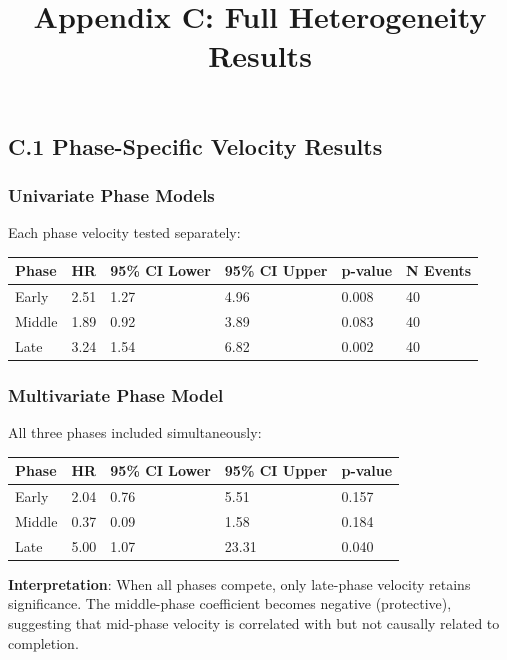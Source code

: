 \documentclass[
  12pt,
  letterpaper,
]{article}
\title{Appendix C: Full Heterogeneity Results}
\author{}
\date{}
\begin{document}
\maketitle


\subsection{C.1 Phase-Specific Velocity
Results}\label{c.1-phase-specific-velocity-results}

\subsubsection{Univariate Phase Models}\label{univariate-phase-models}

Each phase velocity tested separately:

\begin{longtable}[]{@{}llllll@{}}
\toprule\noalign{}
Phase & HR & 95\% CI Lower & 95\% CI Upper & p-value & N Events \\
\midrule\noalign{}
\endhead
\bottomrule\noalign{}
\endlastfoot
Early & 2.51 & 1.27 & 4.96 & 0.008 & 40 \\
Middle & 1.89 & 0.92 & 3.89 & 0.083 & 40 \\
Late & 3.24 & 1.54 & 6.82 & 0.002 & 40 \\
\end{longtable}

\subsubsection{Multivariate Phase Model}\label{multivariate-phase-model}

All three phases included simultaneously:

\begin{longtable}[]{@{}lllll@{}}
\toprule\noalign{}
Phase & HR & 95\% CI Lower & 95\% CI Upper & p-value \\
\midrule\noalign{}
\endhead
\bottomrule\noalign{}
\endlastfoot
Early & 2.04 & 0.76 & 5.51 & 0.157 \\
Middle & 0.37 & 0.09 & 1.58 & 0.184 \\
Late & 5.00 & 1.07 & 23.31 & 0.040 \\
\end{longtable}

\textbf{Interpretation}: When all phases compete, only late-phase
velocity retains significance. The middle-phase coefficient becomes
negative (protective), suggesting that mid-phase velocity is correlated
with but not causally related to completion.
\end{document}
